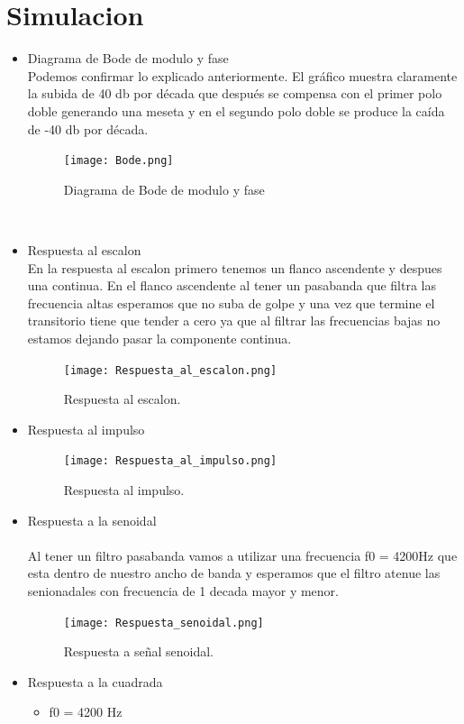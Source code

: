 \documentclass[11pt]{diazessay} %
\begin{document}
\newpage
\section*{Simulacion}
\begin{itemize}
\item Diagrama de Bode de modulo y fase \\
Podemos confirmar lo explicado anteriormente. El gráfico muestra claramente la subida de 40 db por década que después se compensa con el primer polo doble generando una meseta y en el segundo polo doble se produce la caída de -40 db por década.\\
\begin{figure}[h]
	\centering
	\texttt{[image: Bode.png]}
\caption{Diagrama de Bode de modulo y fase}
\end{figure}\\
\newpage
\item Respuesta al escalon\\
En la respuesta al escalon primero tenemos un flanco ascendente y despues una continua. En el flanco ascendente al tener un pasabanda que filtra las frecuencia altas esperamos que no suba de golpe y una vez que termine el transitorio tiene que tender a cero ya que al filtrar las frecuencias bajas no estamos dejando pasar la componente continua.
\begin{figure}[h]
	\centering
	\texttt{[image: Respuesta\_al\_escalon.png]}
\caption{Respuesta al escalon.}
\end{figure}
\newpage
\item Respuesta al impulso
\begin{figure}[h]
	\centering
	\texttt{[image: Respuesta\_al\_impulso.png]}
\caption{Respuesta al impulso.}
\end{figure}
\item Respuesta a la senoidal \\
\\
Al tener un filtro pasabanda vamos a utilizar una frecuencia f0 = 4200Hz que esta dentro de nuestro ancho de banda y esperamos que el filtro atenue las senionadales con frecuencia de 1 decada mayor y menor.
\begin{figure}[h]
	\centering
	\texttt{[image: Respuesta\_senoidal.png]}
\caption{Respuesta a señal senoidal.}
\end{figure}
\newpage
\item Respuesta a la cuadrada
\begin{itemize}
\item f0 = 4200 Hz \\

\end{itemize}
\end{itemize}
\end{document}
